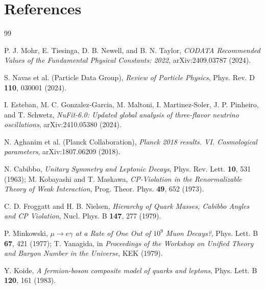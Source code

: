 \documentclass[11pt]{article}
\begin{document}
\section{References}

\begin{thebibliography}{99}

P. J. Mohr, E. Tiesinga, D. B. Newell, and B. N. Taylor,
\emph{CODATA Recommended Values of the Fundamental Physical Constants: 2022},
arXiv:2409.03787 (2024).

S. Navas et al. (Particle Data Group),
\emph{Review of Particle Physics},
Phys. Rev. D \textbf{110}, 030001 (2024).

I. Esteban, M. C. Gonzalez-Garcia, M. Maltoni, I. Martinez-Soler, J. P. Pinheiro, and T. Schwetz,
\emph{NuFit-6.0: Updated global analysis of three-flavor neutrino oscillations},
arXiv:2410.05380 (2024).

N. Aghanim et al. (Planck Collaboration),
\emph{Planck 2018 results. VI. Cosmological parameters},
arXiv:1807.06209 (2018).

N. Cabibbo, \emph{Unitary Symmetry and Leptonic Decays}, Phys. Rev. Lett. \textbf{10}, 531 (1963);
M. Kobayashi and T. Maskawa, \emph{CP-Violation in the Renormalizable Theory of Weak Interaction}, Prog. Theor. Phys. \textbf{49}, 652 (1973).

C. D. Froggatt and H. B. Nielsen,
\emph{Hierarchy of Quark Masses, Cabibbo Angles and CP Violation},
Nucl. Phys. B \textbf{147}, 277 (1979).

P. Minkowski,
\emph{\(\mu\to e\gamma\) at a Rate of One Out of \(10^9\) Muon Decays?},
Phys. Lett. B \textbf{67}, 421 (1977);
T. Yanagida, in \emph{Proceedings of the Workshop on Unified Theory and Baryon Number in the Universe}, KEK (1979).

Y. Koide,
\emph{A fermion-boson composite model of quarks and leptons},
Phys. Lett. B \textbf{120}, 161 (1983).

\end{thebibliography}
\end{document}
